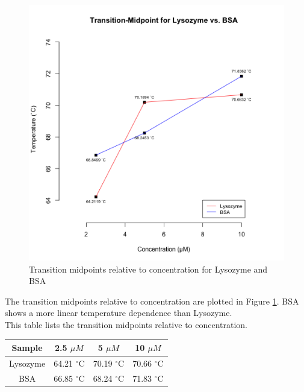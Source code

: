 \documentclass[a4paper,11pt]{article}
\begin{document}
            \begin{minipage}{0.5\textwidth}
                \begin{figure}[H]
                    \centering
                    \includegraphics[width=\textwidth]{../resources/unfolding_tempVconc.png}
                    \caption{Transition midpoints relative to concentration for Lysozyme and BSA}
                    \label{fig:temp_v_mid}
                \end{figure}
            \end{minipage}
            \begin{minipage}{0.45\textwidth}
                \vspace{-8em}
                The transition midpoints relative to concentration are plotted in Figure \ref{fig:temp_v_mid}.
                BSA shows a more linear temperature dependence than Lysozyme. \\
                
                This table lists the transition midpoints relative to concentration.\\

                \begin{tabular}{| c | c | c | c |}
                    \hline
                    {\bfseries Sample} & 2.5 $\mu M$ & 5 $\mu M$ & 10 $\mu M$ \\
                    \hline
                    Lysozyme & 64.21 $^{\circ}$C & 70.19 $^{\circ}$C & 70.66 $^{\circ}$C \\
                    BSA & 66.85 $^{\circ}$C & 68.24 $^{\circ}$C & 71.83 $^{\circ}$C \\
                    \hline
                \end{tabular}
            \end{minipage}
    \pagebreak
    
\end{document}
